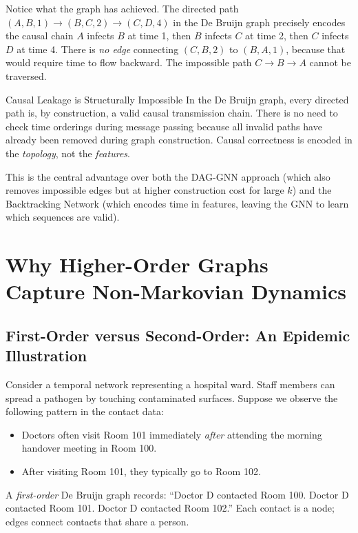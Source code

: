 Notice what the graph has achieved. The directed path
$(A,B,1) \to (B,C,2) \to (C,D,4)$
in the De Bruijn graph precisely encodes the causal chain
$A$ infects $B$ at time 1, then $B$ infects $C$ at time 2, then $C$ infects $D$ at time 4.
There is \emph{no edge} connecting $(C,B,2)$ to $(B,A,1)$, because that would require time
to flow backward. The impossible path $C \to B \to A$ cannot be traversed.

\begin{keyinsight}{Causal Leakage is Structurally Impossible}
In the De Bruijn graph, every directed path is, by construction, a valid causal transmission
chain. There is no need to check time orderings during message passing because all invalid paths
have already been removed during graph construction. Causal correctness is encoded in the
\emph{topology}, not the \emph{features}.

This is the central advantage over both the DAG-GNN approach (which also removes impossible edges
but at higher construction cost for large $k$) and the Backtracking Network (which encodes time
in features, leaving the GNN to learn which sequences are valid).
\end{keyinsight}

\section{Why Higher-Order Graphs Capture Non-Markovian Dynamics}

\subsection{First-Order versus Second-Order: An Epidemic Illustration}

Consider a temporal network representing a hospital ward. Staff members can spread a pathogen
by touching contaminated surfaces. Suppose we observe the following pattern in the contact data:
\begin{itemize}[noitemsep]
    \item Doctors often visit Room 101 immediately \emph{after} attending the morning handover
          meeting in Room 100.
    \item After visiting Room 101, they typically go to Room 102.
\end{itemize}

A \emph{first-order} De Bruijn graph records: ``Doctor D contacted Room 100. Doctor D contacted
Room 101. Doctor D contacted Room 102.'' Each contact is a node; edges connect contacts that
share a person.

